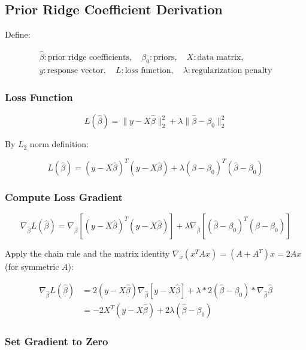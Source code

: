 \documentclass[
  12pt]{article}
\begin{document}
\subsection{Prior Ridge Coefficient Derivation}\label{sec-derivation}

Define:

\[
\begin{aligned}
\hat{\beta}: \text{prior ridge coefficients}, \quad
\beta_0: \text{priors}, \quad
X: \text{data matrix}, \\
y: \text{response vector}, \quad
L: \text{loss function}, \quad \lambda: \text{regularization penalty}
\end{aligned}
\]

\subsubsection*{Loss Function}\label{loss-function}

\[
L(\hat{\beta}) = \| y - X\hat{\beta} \|_2^2 + \lambda \| \hat{\beta} - \beta_0 \|_2^2
\]

By \(L_2\) norm definition:

\[
L(\hat{\beta}) = (y - X\hat{\beta})^{T} (y - X\hat{\beta}) +
\lambda (\hat{\beta} - \beta_0)^{T} (\hat{\beta} - \beta_0)
\]

\subsubsection*{Compute Loss Gradient}\label{compute-loss-gradient}

\[
\nabla_{\hat{\beta}} L(\hat{\beta})
= \nabla_{\hat{\beta}} [(y - X\hat{\beta})^{T} (y - X\hat{\beta})]
+ \lambda \nabla_{\hat{\beta}} [(\hat{\beta} - \beta_0)^{T} (\hat{\beta} - \beta_0)]
\]

Apply the chain rule and the matrix identity
\(\nabla_{x} (x^{T}A x) = (A + A^{T})x = 2A x\) (for symmetric \(A\)):

\[
\begin{aligned}
\nabla_{\hat{\beta}} L(\hat{\beta})
&= 2(y - X\hat{\beta})\nabla_{\hat{\beta}}[y - X\hat{\beta}] + \lambda * 2(\hat{\beta} - \beta_0) * \nabla_{\hat{\beta}} \hat{\beta} \\
&= -2X^T(y - X\hat{\beta}) + 2\lambda(\hat{\beta} - \beta_0)
\end{aligned}
\]

\subsubsection*{Set Gradient to Zero}\label{set-gradient-to-zero}
\end{document}
